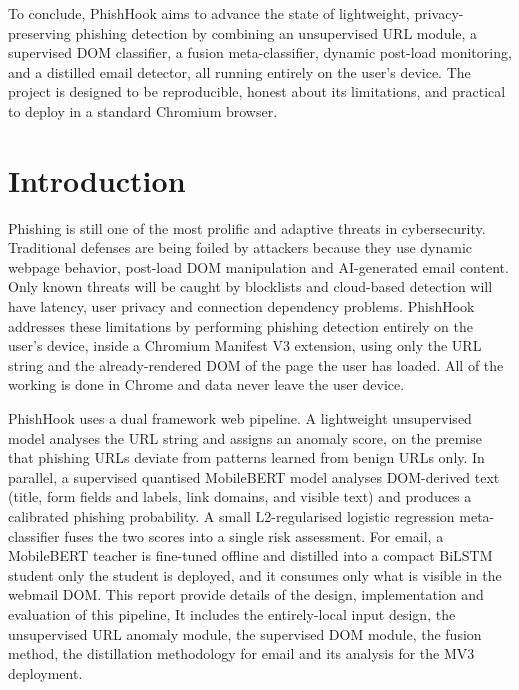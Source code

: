 \documentclass{FastFyp}
\begin{document}
To conclude, PhishHook aims to advance the state of lightweight, privacy-preserving phishing detection by combining an unsupervised URL module, a supervised DOM classifier, a fusion meta-classifier, dynamic post-load monitoring, and a distilled email detector, all running entirely on the user's device. The project is designed to be reproducible, honest about its limitations, and practical to deploy in a standard Chromium browser.
\pagebreak

\pagestyle{fancy}
\tableofcontents

\pagebreak
\listoffigures
{}
\pagebreak
\listoftables
{}

\mainmatter

\chapter{Introduction}
\label{ch:intro}
Phishing is still one of the most prolific and adaptive threats in cybersecurity. Traditional defenses are being foiled by attackers because they use dynamic webpage behavior, post-load DOM manipulation and AI-generated email content. Only known threats will be caught by blocklists and cloud-based detection will have latency, user privacy and connection dependency problems. PhishHook addresses these limitations by performing phishing detection entirely on the user's device, inside a Chromium Manifest V3 extension, using only the URL string and the already-rendered DOM of the page the user has loaded. All of the working is done in Chrome and data never leave the user device. 

PhishHook uses a dual framework web pipeline. A lightweight unsupervised model analyses the URL string and assigns an anomaly score, on the premise that phishing URLs deviate from patterns learned from benign URLs only. In parallel, a supervised quantised MobileBERT model analyses DOM-derived text (title, form fields and labels, link domains, and visible text) and produces a calibrated phishing probability. A small L2-regularised logistic regression meta-classifier fuses the two scores into a single risk assessment. For email, a MobileBERT teacher is fine-tuned offline and distilled into a compact BiLSTM student only the student is deployed, and it consumes only what is visible in the webmail DOM. This report provide details of the design, implementation and evaluation of this pipeline,
It includes the entirely-local input design, the unsupervised URL anomaly module, the supervised DOM module, the fusion method, the distillation methodology for email and its analysis for the MV3 deployment.
\end{document}
